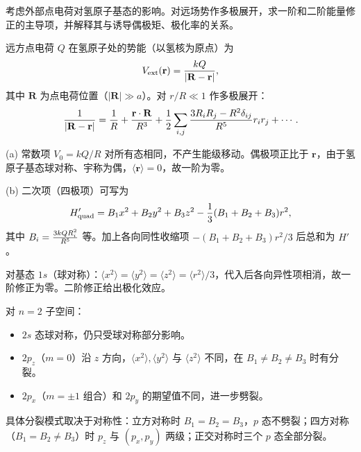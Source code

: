 \begin{question}
考虑外部点电荷对氢原子基态的影响。对远场势作多极展开，求一阶和二阶能量修正的主导项，并解释其与诱导偶极矩、极化率的关系。
\end{question}
\begin{solution}
远方点电荷 $Q$ 在氢原子处的势能（以氢核为原点）为
\[
V_{\rm ext}(\mathbf r) = {kQ\over|\mathbf R-\mathbf r|},
\]
其中 $\mathbf R$ 为点电荷位置（$|\mathbf R|\gg a$）。对 $r/R\ll1$ 作多极展开：
\[
{1\over|\mathbf R-\mathbf r|} = {1\over R} + {\mathbf r\cdot\mathbf R\over R^3} + {1\over2}\sum_{i,j}{3R_iR_j-R^2\delta_{ij}\over R^5}r_ir_j + \cdots.
\]

(a) 常数项 $V_0=kQ/R$ 对所有态相同，不产生能级移动。偶极项正比于 $\mathbf r$，由于氢原子基态球对称、宇称为偶，$\langle\mathbf r\rangle=0$，故一阶为零。

(b) 二次项（四极项）可写为
\[
H'_{\rm quad} = B_1x^2+B_2y^2+B_3z^2 - {1\over3}(B_1+B_2+B_3)r^2,
\]
其中 $B_i = {3kQ R_i^2\over R^5}$ 等。加上各向同性收缩项 $-(B_1+B_2+B_3)r^2/3$ 后总和为 $H'$。

对基态 $1s$（球对称）：$\langle x^2\rangle=\langle y^2\rangle=\langle z^2\rangle = \langle r^2\rangle/3$，代入后各向异性项相消，故一阶修正为零。二阶修正给出极化效应。

对 $n=2$ 子空间：
\begin{itemize}
\item $2s$ 态球对称，仍只受球对称部分影响。
\item $2p_z$（$m=0$）沿 $z$ 方向，$\langle x^2\rangle,\langle y^2\rangle$ 与 $\langle z^2\rangle$ 不同，在 $B_1\neq B_2\neq B_3$ 时有分裂。
\item $2p_x$（$m=\pm1$ 组合）和 $2p_y$ 的期望值不同，进一步劈裂。
\end{itemize}
具体分裂模式取决于对称性：立方对称时 $B_1=B_2=B_3$，$p$ 态不劈裂；四方对称（$B_1=B_2\neq B_3$）时 $p_z$ 与 $(p_x,p_y)$ 两级；正交对称时三个 $p$ 态全部分裂。
\end{solution}

